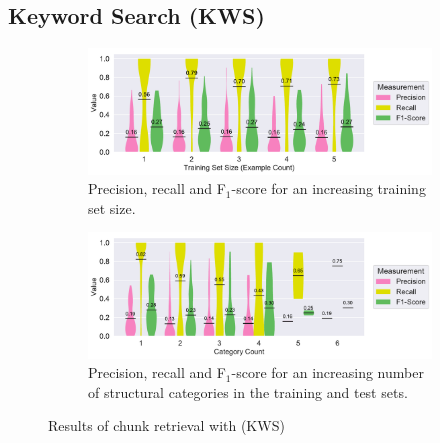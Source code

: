 




\newpage
\subsection{Keyword Search (KWS)}

\begin{figure}
\begin{subfigure}[b]{\columnwidth}
		\centering
		\includegraphics[width=\columnwidth, clip]{img/big-study/recall-precision-examplecount-KWS.pdf}
		\caption{Precision, recall and F$_{1}$-score for an increasing training set size.}
		\label{fig:recall-precision-examplecount-KWS}
\end{subfigure}\hspace{\fill}
\begin{subfigure}[b]{\columnwidth}
		\centering
		\includegraphics[width=\columnwidth, clip]{img/big-study/recall-precision-categorycount-KWS.pdf}
		\caption{Precision, recall and F$_{1}$-score for an increasing number of structural categories in the training and test sets.}
		\label{fig:recall-precision-categorycount-KWS}
\end{subfigure}
\caption{Results of chunk retrieval with  (KWS)}
\end{figure}


